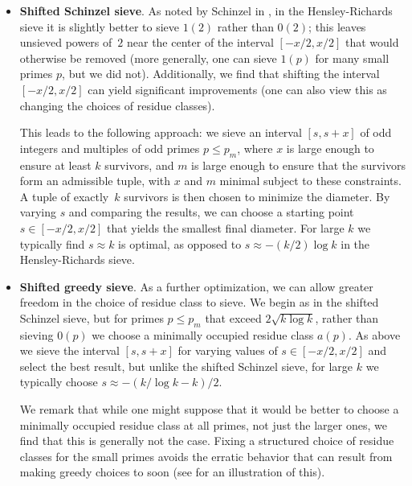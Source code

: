 \begin{itemize}

\item\textbf{Shifted Schinzel sieve}.
As noted by Schinzel in \cite{schinzel}, in the Hensley-Richards sieve it is slightly better to sieve $1(2)$ rather than $0(2)$; this leaves unsieved powers of~$2$ near the center of the interval $[-x/2,x/2]$ that would otherwise be removed (more generally, one can sieve $1(p)$ for many small primes $p$, but we did not).
Additionally, we find that shifting the interval $[-x/2,x/2]$ can yield significant improvements (one can also view this as changing the choices of residue classes).

This leads to the following approach: we sieve an interval $[s,s+x]$ of odd integers and multiples of odd primes $p\le p_m$, where $x$ is large enough to ensure at least $k$ survivors, and $m$ is large enough to ensure that the survivors form an admissible tuple, with $x$ and $m$ minimal subject to these constraints.  A tuple of exactly~$k$ survivors is then chosen to minimize the diameter.  By varying $s$ and comparing the results, we can choose a starting point $s\in [-x/2,x/2]$ that yields the smallest final diameter.
For large $k$ we typically find $s\approx k$ is optimal, as opposed to $s\approx -(k/2)\log k$ in the Hensley-Richards sieve.
\smallbreak

\item\textbf{Shifted greedy sieve}.
As a further optimization, we can allow greater freedom in the choice of residue class to sieve.
We begin as in the shifted Schinzel sieve, but for primes $p \le p_m$ that exceed $2\sqrt{k\log k}$, rather than sieving $0(p)$ we choose a minimally occupied residue class $a(p)$.
As above we sieve the interval $[s,s+x]$ for varying values of $s\in [-x/2,x/2]$ and select the best result, but unlike the shifted Schinzel sieve, for large $k$ we typically choose $s\approx -(k/\log k - k)/2$.

We remark that while one might suppose that it would be better to choose a minimally occupied residue class at all primes, not just the larger ones, we find that this is generally not the case.  Fixing a structured choice of residue classes for the small primes avoids the erratic behavior that can result from making greedy choices to soon (see \cite[Fig. 1]{gordon} for an illustration of this).

\end{itemize}
\smallbreak

